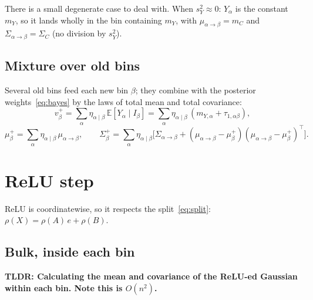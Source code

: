 \documentclass[11pt]{article}
\newcommand{\E}{\mathbb{E}}
\newcommand{\relu}{\rho}
\begin{document}
There is a small degenerate case to deal with. When $s_Y^2 \approx 0$: $Y_\alpha$ is the constant $m_Y$, so it lands wholly in the bin containing $m_Y$, with $\mu_{\alpha\to\beta} = m_C$ and $\Sigma_{\alpha\to\beta} = \Sigma_C$ (no division by $s_Y^2$).

\subsection{Mixture over old bins}
Several old bins feed each new bin $\beta$; they combine with the posterior weights~\eqref{eq:bayes} by the laws of total mean and total covariance:
\begin{equation}
v^+_\beta = \sum_\alpha \eta_{\alpha\mid\beta}\, \E[Y_\alpha \mid I_\beta]
= \sum_\alpha \eta_{\alpha\mid\beta}\,(m_{Y,\alpha} + \tau_{1,\alpha\beta}),
\label{eq:vplus}
\end{equation}
\begin{equation}
\mu^+_\beta = \sum_\alpha \eta_{\alpha\mid\beta}\, \mu_{\alpha\to\beta}, \qquad
\Sigma^+_\beta = \sum_\alpha \eta_{\alpha\mid\beta} \Big[ \Sigma_{\alpha\to\beta}
+ (\mu_{\alpha\to\beta} - \mu^+_\beta)(\mu_{\alpha\to\beta} - \mu^+_\beta)^\top \Big].
\label{eq:merge}
\end{equation}

\section{ReLU step}
\label{sec:relu}

ReLU is coordinatewise, so it respects the split~\eqref{eq:split}: $\relu(X) = \relu(A)\, e + \relu(B)$.

\subsection{Bulk, inside each bin}
\textbf{TLDR: Calculating the mean and covariance of the ReLU-ed Gaussian within each bin. Note this is $O(n^2)$.}
\end{document}
